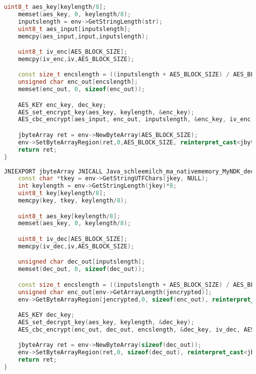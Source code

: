 \begin{appendices}
\begin{lstlisting}[language=C++, caption=AES Encrypt(), label=nkd_aes_encrypt]
    uint8_t aes_key[keylength/8];
    memset(aes_key, 0, keylength/8);
    inputslength = env->GetStringLength(str);
    uint8_t aes_input[inputslength];
    memcpy(aes_input,input,inputslength);

    uint8_t iv_enc[AES_BLOCK_SIZE];
    memcpy(iv_enc,iv,AES_BLOCK_SIZE);

    const size_t encslength = ((inputslength + AES_BLOCK_SIZE) / AES_BLOCK_SIZE) * AES_BLOCK_SIZE;
    unsigned char enc_out[encslength];
    memset(enc_out, 0, sizeof(enc_out));

    AES_KEY enc_key, dec_key;
    AES_set_encrypt_key(aes_key, keylength, &enc_key);
    AES_cbc_encrypt(aes_input, enc_out, inputslength, &enc_key, iv_enc, AES_ENCRYPT);

    jbyteArray ret = env->NewByteArray(AES_BLOCK_SIZE);
    env->SetByteArrayRegion(ret,0,AES_BLOCK_SIZE, reinterpret_cast<jbyte *>(enc_out));
    return ret;
}
\end{lstlisting}
\begin{lstlisting}[language=C++, caption=AES Decrypt(), label=nkd_aes_decrypt]
JNIEXPORT jbyteArray JNICALL Java_schleemilch_ma_nativememory_MyNDK_decrypt (JNIEnv *env, jobject obj, jbyteArray jencrypted, jstring jkey){
    const char *tkey = env->GetStringUTFChars(jkey, NULL);
    int keylength = env->GetStringLength(jkey)*8;
    uint8_t key[keylength/8];
    memcpy(key, tkey, keylength/8);

    uint8_t aes_key[keylength/8];
    memset(aes_key, 0, keylength/8);

    uint8_t iv_dec[AES_BLOCK_SIZE];
    memcpy(iv_dec,iv,AES_BLOCK_SIZE);

    unsigned char dec_out[inputslength];
    memset(dec_out, 0, sizeof(dec_out));

    const size_t encslength = ((inputslength + AES_BLOCK_SIZE) / AES_BLOCK_SIZE) * AES_BLOCK_SIZE;
    unsigned char enc_out[env->GetArrayLength(jencrypted)];
    env->GetByteArrayRegion(jencrypted,0, sizeof(enc_out), reinterpret_cast<jbyte*>(enc_out));

    AES_KEY dec_key;
    AES_set_decrypt_key(aes_key, keylength, &dec_key);
    AES_cbc_encrypt(enc_out, dec_out, encslength, &dec_key, iv_dec, AES_DECRYPT);

    jbyteArray ret = env->NewByteArray(sizeof(dec_out));
    env->SetByteArrayRegion(ret,0, sizeof(dec_out), reinterpret_cast<jbyte *>(dec_out));
    return ret;
}
\end{lstlisting}


\end{appendices}
